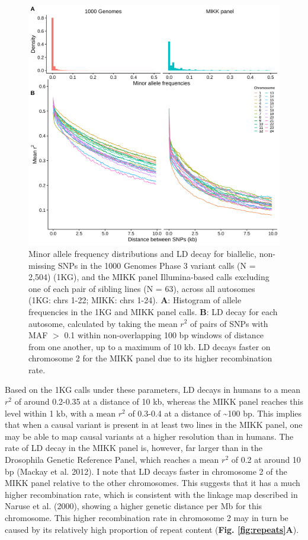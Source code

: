 \documentclass[
]{book}
\begin{document}
\begin{figure}
\includegraphics[width=1\linewidth]{figs/mikk_genome/08_ld_decay} \caption{Minor allele frequency distributions and LD decay for biallelic, non-missing SNPs in the 1000 Genomes Phase 3 variant calls (N = 2,504) (1KG), and the MIKK panel Illumina-based calls excluding one of each pair of sibling lines (N = 63), across all autosomes (1KG: chrs 1-22; MIKK: chrs 1-24). \textbf{A}: Histogram of allele frequencies in the 1KG and MIKK panel calls. \textbf{B}: LD decay for each autosome, calculated by taking the mean \(r^2\) of pairs of SNPs with MAF \(>\) 0.1 within non-overlapping 100 bp windows of distance from one another, up to a maximum of 10 kb. LD decays faster on chromosome 2 for the MIKK panel due to its higher recombination rate.}\label{fig:LDdecay}
\end{figure}

Based on the 1KG calls under these parameters, LD decays in humans to a mean \(r^2\) of around 0.2-0.35 at a distance of 10 kb, whereas the MIKK panel reaches this level within 1 kb, with a mean \(r^2\) of 0.3-0.4 at a distance of \textasciitilde100 bp. This implies that when a causal variant is present in at least two lines in the MIKK panel, one may be able to map causal variants at a higher resolution than in humans. The rate of LD decay in the MIKK panel is, however, far larger than in the Drosophila Genetic Reference Panel, which reaches a mean \(r^2\) of 0.2 at around 10 bp (Mackay et al. 2012). I note that LD decays faster in chromosome 2 of the MIKK panel relative to the other chromosomes. This suggests that it has a much higher recombination rate, which is consistent with the linkage map described in Naruse et al. (2000), showing a higher genetic distance per Mb for this chromosome. This higher recombination rate in chromosome 2 may in turn be caused by its relatively high proportion of repeat content (\textbf{Fig. \ref{fig:repeats}A}).
\end{document}
